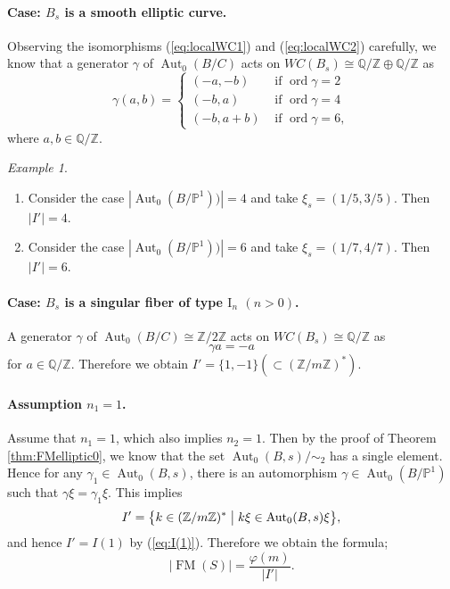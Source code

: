 \documentclass[a4paper,11pt]{article}
\theoremstyle{definition}\newtheorem{defn}[thm]{Definition}
\theoremstyle{remark}\newtheorem{remark}[thm]{Remark}
\newtheorem{ex}[thm]{Example}
\numberwithin{equation}{section}
\newcommand{\Aut}{\ensuremath{\operatorname{Aut}}}
\newcommand{\order}{\ensuremath{\operatorname{ord}}}
\newcommand{\FM}{\operatorname{FM}}
\newcommand{\rom}{\textrm}
\newcommand{\PP}{\mathbb P}
\newcommand{\Z}{\mathbb Z}
\newcommand{\Q}{\mathbb Q}
\begin{document}
 
\paragraph{Case: $B_s$ is a smooth elliptic curve.}
Observing the isomorphisms (\ref{eq:localWC1}) and (\ref{eq:localWC2})
carefully,
we know that a generator $\gamma$ of $\Aut_0(B/C)$ acts on   
$
WC(B_{s})\cong \Q/\Z\oplus \Q/\Z
$
as 
\begin{equation}\label{eq:gamma}
\gamma (a,b)=\begin{cases}
 (-a,-b)   & \text{ if } \order\gamma=2\\
  (-b,a)   &  \text{ if }\order\gamma=4\\
(-b,a+b) &  \text{ if }\order\gamma=6,
\end{cases}
\end{equation}
where $a,b\in \Q/\Z$.

\begin{ex}\label{ex:46}
\begin{enumerate}
\item
Consider the case $|\Aut_0(B/\PP^1))|=4$ and take
$\xi_s=(1/5,3/5)$. Then $|I'|=4$.
\item
Consider the case $|\Aut_0(B/\PP^1))|=6$ and take
 $\xi_s=(1/7,4/7)$. Then $|I'|=6$.
\end{enumerate}
\end{ex}



\paragraph{Case: $B_s$ is a singular fiber of type $\rom{I}_n$ $(n>0)$.}
A generator $\gamma$ of $\Aut_0(B/C)\cong \Z/2\Z$ acts on   
$
WC(B_{s}) \cong \Q/\Z
$
as 
\begin{equation}
\gamma a=-a
\end{equation}
for $a\in \Q/\Z$.
Therefore we obtain
$I'=\{1,-1\}(\subset (\Z/m\Z)^*)$. 
%

\paragraph{Assumption $n_1=1$.}
Assume that $n_1=1$, which also implies $n_2=1$.
Then by the proof of Theorem \ref{thm:FMelliptic0}, 
we know that the set $\Aut _0(B,s)/\sim_2$ has a single element.
Hence
for any $\gamma_1\in \Aut_0(B,s)$, there is an automorphism
$\gamma\in \Aut_0(B/\PP ^1)$ such that
$\gamma\xi= \gamma_1\xi$.  
This implies 
%
\[
I'=\bigl\{ 
k\in  (\Z/m\Z)^*  \bigm|
k\xi \in \Aut _0(B,s)\xi 
\bigr\},
\]
%
and hence $I'=I(1)$ by (\ref{eq:I(1)}).
Therefore we obtain the formula;
$$
|\FM(S)|=\frac{\varphi (m)}{|I'|}.
$$
\end{document}
